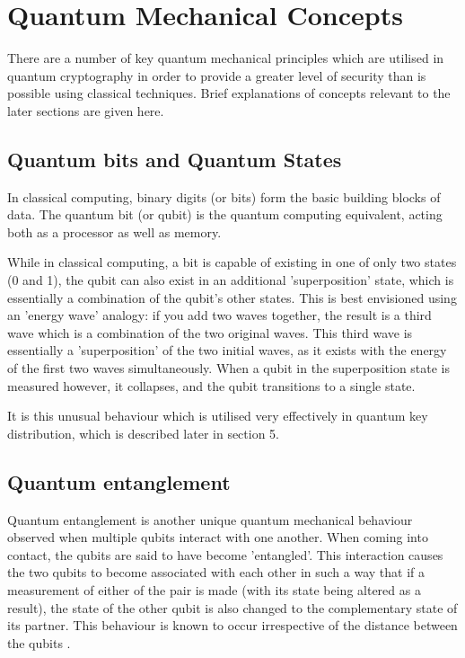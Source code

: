\documentclass[runningheads,a4paper]{llncs}
\begin{document}
\section{Quantum Mechanical Concepts}

There are a number of key quantum mechanical principles which are utilised in quantum cryptography in order to provide a greater level of security than is possible using classical techniques. Brief explanations of concepts relevant to the later sections are given here.

\subsection{Quantum bits and Quantum States}

In classical computing, binary digits (or bits) form the basic building blocks of data. The quantum bit (or qubit) is the quantum computing equivalent, acting both as a processor as well as memory. 

While in classical computing, a bit is capable of existing in one of only two states (0 and 1), the qubit can also exist in an additional 'superposition' state, which is essentially a combination of the qubit's other states. This is best envisioned using an 'energy wave' analogy: if you add two waves together, the result is a third wave which is a combination of the two original waves. This third wave is essentially a 'superposition' of the two initial waves, as it exists with the energy of the first two waves simultaneously. When a qubit in the superposition state is measured however, it collapses, and the qubit transitions to a single state. 

It is this unusual behaviour which is utilised very effectively in quantum key distribution, which is described later in section 5.

\subsection{Quantum entanglement}

Quantum entanglement is another unique quantum mechanical behaviour observed when multiple qubits interact with one another. When coming into contact, the qubits are said to have become 'entangled'. This interaction causes the two qubits to become associated with each other in such a way that if a measurement of either of the pair is made (with its state being altered as a result), the state of the other qubit is also changed to the complementary state of its partner. This behaviour is known to occur irrespective of the distance between the qubits \cite{Tegmark:2001qh}.
\end{document}
